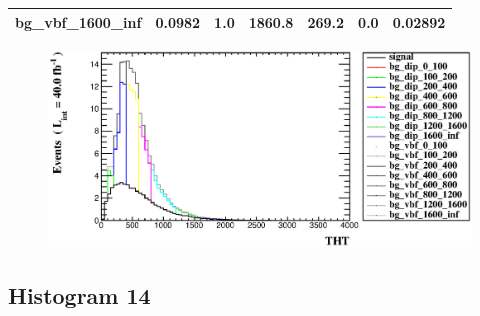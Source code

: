 \documentclass[a4paper, 10pt]{article}
\begin{document}
\begin{table}[H]
\begin{center}
\begin{tabular}{|m{23.0mm}|m{23.0mm}|m{18.0mm}|m{19.0mm}|m{19.0mm}|m{19.0mm}|m{19.0mm}|}
      \hline
      {\cellcolor{white}         bg\_vbf\_1600\_inf}& {\cellcolor{white}         0.0982}& {\cellcolor{white}         1.0}& {\cellcolor{white}         1860.8}& {\cellcolor{white}         269.2}& {\cellcolor{green}         0.0}& {\cellcolor{green}         0.02892}\\
\hline
    \end{tabular}
  \end{center}
\end{table}

\begin{figure}[H]
  \begin{center}
    \includegraphics[scale=0.45]{selection_12.eps}\\
\caption{   }
  \end{center}
\end{figure}
      \newpage
\subsection{ Histogram 14}
\end{document}
